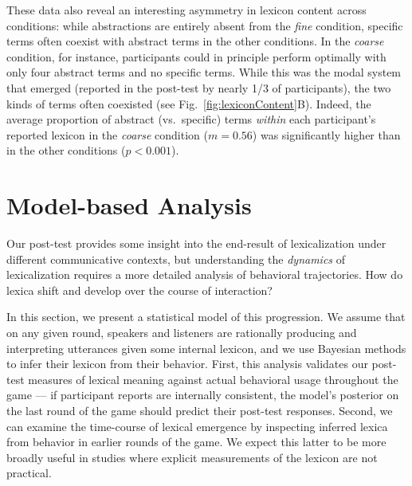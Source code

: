 \documentclass[10pt,letterpaper]{article}
\newcommand{\ndg}[1]{\textcolor{Green}{[ndg: #1]}}
\begin{document}
These data also reveal an interesting asymmetry in lexicon content across conditions: while abstractions are entirely absent from the \emph{fine} condition, specific terms often coexist with abstract terms in the other conditions. In the \emph{coarse} condition, for instance, participants could in principle perform optimally with only four abstract terms and no specific terms. While this was the modal system that emerged (reported in the post-test by nearly 1/3 of participants), the two kinds of terms often coexisted (see Fig.\ \ref{fig:lexiconContent}B). Indeed, the average proportion of abstract (vs.\ specific) terms \emph{within} each participant's reported lexicon in the \emph{coarse} condition ($m = 0.56$) was significantly higher than in the other conditions ($p < 0.001$).

\section{Model-based Analysis}

Our post-test provides some insight into the end-result of lexicalization under different communicative contexts, but understanding the \emph{dynamics} of lexicalization requires a more detailed analysis of behavioral trajectories. How do lexica shift and develop over the course of interaction? 

In this section, we present a statistical model of this progression. We assume that on any given round, speakers and listeners are rationally producing and interpreting utterances given some internal lexicon, and we use Bayesian methods to infer their lexicon from their behavior. First, this analysis validates our post-test measures of lexical meaning against actual behavioral usage throughout the game --- if participant reports are internally consistent, the model's posterior on the last round of the game should predict their post-test responses. Second, we can examine the time-course of lexical emergence by inspecting inferred lexica from behavior in earlier rounds of the game. We expect this latter to be more broadly useful in studies where explicit measurements of the lexicon are not practical. %
\end{document}
